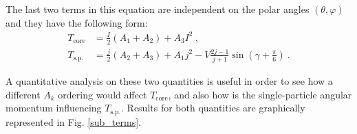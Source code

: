 \documentclass[myclassdoc,debug]{rjparticle}
\begin{document}
The last two terms in this equation are independent on the polar angles $(\theta,\varphi)$ and they have the following form:
\begin{align}
    T_\text{core}&=\frac{I}{2}(A_1+A_2)+A_3I^2\ , \label{core-sub-term} \\
    T_\text{s.p.}&=\frac{j}{2}(A_2+A_3)+A_1j^2-V\frac{2j-1}{j+1}\sin\left(\gamma+\frac{\pi}{6}\right)\ .
    \label{single-particle-sub-term}
\end{align}

A quantitative analysis on these two quantities is useful in order to see how a different $A_k$ ordering would affect $T_\text{core}$, and also how is the single-particle angular momentum influencing $T_\text{s.p.}$. Results for both quantities are graphically represented in Fig. \ref{sub_terms}.
\end{document}
